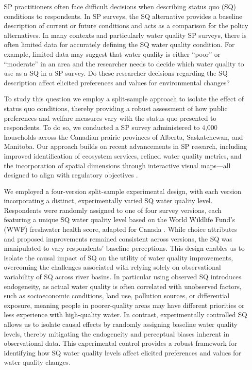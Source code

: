 \documentclass[12pt]{article}
\begin{document}
SP practitioners often face difficult decisions when describing status quo (SQ) conditions to respondents. In SP surveys, 
the SQ alternative provides a baseline description of current or future conditions and acts as a comparison for the policy alternatives.
In many contexts and particularly water quality SP surveys, there is often limited data for accurately defining the SQ water quality 
condition. For example, limited data may suggest that water quality is either ``poor'' or ``moderate'' in an area and the researcher needs to 
decide which water quality to use as a SQ in a SP survey.
Do these researcher decisions regarding the SQ description affect elicited preferences and values for environmental changes?


To study this question we employ a split-sample approach to isolate the effect of 
status quo conditions, thereby providing a robust assessment of how public preferences and welfare measures vary with the status quo 
presented to respondents. To do so, we conducted a SP survey administered to 4,000 households across the Canadian prairie provinces 
of Alberta, Saskatchewan, and Manitoba. Our approach builds on recent advancements in SP research, including improved identification of 
ecosystem services, refined water quality metrics, and the incorporation of spatial dimensions through interactive visual maps—all 
designed to align with regulatory objectives \autocite{moore2023measuring, kling2012exxon, johnston2017contemporary, vossler2023valuing, bateman2023perspectives}.


We employed a four-version split-sample experimental design, with each version incorporating a distinct, experimentally varied SQ 
water quality level. Respondents were randomly assigned to one of four survey versions, each featuring a unique SQ water quality 
level based on the World Wildlife Fund’s (WWF) freshwater health score, adapted for Canada \parencite{WWF2020}. While choice attributes 
and proposed improvements remained consistent across versions, the SQ was manipulated to vary respondents’ baseline perceptions. This 
design enables us to isolate the causal impact of SQ on the utility of water quality improvements, overcoming the challenges 
associated with relying solely on observational variability of SQ across river basins. In particular using observed SQ introduces endogeneity, 
as actual water quality is often correlated with unobserved factors, such as socioeconomic conditions, land use, pollution sources, or 
differential exposure, meaning people in poorer-quality areas may have different priorities or less experience with high-quality water. 
In contrast, experimentally controlled SQ allows us to isolate causal effects by randomly assigning baseline water quality levels, 
thereby mitigating the endogeneity and perceptual biases inherent in observational data. This experimental control provides a robust 
framework for identifying how SQ water quality levels affect elicited preferences and values for water quality changes.
\end{document}
